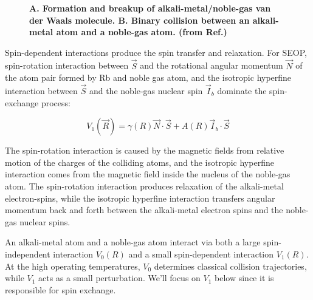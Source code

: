 \begin{figure}[t!]
	\centering
	\caption{{\bf A. Formation and breakup of alkali-metal/noble-gas van der Waals molecule. B. Binary collision between an alkali-metal atom and a noble-gas atom. (from Ref.\@ \cite{WalkerHapper})}}
	\label{SpinExchange}
\end{figure}

Spin-dependent interactions produce the spin transfer and relaxation. For SEOP, spin-rotation interaction between $\vec{S}$ and the rotational angular momentum $\vec{N}$ of the atom pair formed by Rb and noble gas atom, and the isotropic hyperfine interaction between $\vec{S}$ and the noble-gas nuclear spin $\vec{I}_{b}$ dominate the spin-exchange process:

\begin{equation}\label{V1}
V_{1}(\vec{R})=\gamma(R)\vec{N}\cdot \vec{S}+A(R)\vec{I}_{b}\cdot \vec{S}
\end{equation}

The spin-rotation interaction is caused by the magnetic fields from relative motion of the charges of the colliding atoms, and the isotropic hyperfine interaction comes from the magnetic field inside the nucleus of the noble-gas atom. The spin-rotation interaction produces relaxation of the alkali-metal electron-spins, while the isotropic hyperfine interaction transfers angular momentum back and forth between the alkali-metal electron spins and the noble-gas nuclear spins.

An alkali-metal atom and a noble-gas atom interact via both a large spin-independent interaction $V_{0}(R)$ and a small spin-dependent interaction $V_{1}(R)$. At the high operating temperatures, $V_{0}$ determines classical collision trajectories, while $V_{1}$ acts as a small perturbation. We'll focus on $V_{1}$ below since it is responsible for spin exchange.

